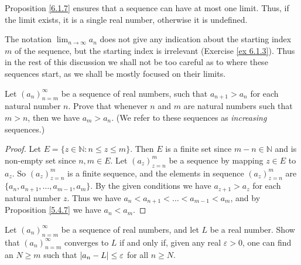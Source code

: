 \begin{note}
Proposition \ref{6.1.7} ensures that a sequence can have at most one limit.
Thus, if the limit exists, it is a single real number, otherwise it is undefined.
\end{note}

\begin{remark}\label{6.1.9}
The notation \(\lim_{n \to \infty} a_n\) does not give any indication about the starting index \(m\) of the sequence, but the starting index is irrelevant (Exercise \ref{ex 6.1.3}).
Thus in the rest of this discussion we shall not be too careful as to where these sequences start, as we shall be mostly focused on their limits.
\end{remark}

\exercisesection

\begin{exercise}\label{ex 6.1.1}
Let \((a_n)_{n = m}^\infty\) be a sequence of real numbers, such that \(a_{n + 1} > a_n\) for each natural number \(n\).
Prove that whenever \(n\) and \(m\) are natural numbers such that \(m > n\), then we have \(a_m > a_n\).
(We refer to these sequences as \emph{increasing} sequences.)
\end{exercise}

\begin{proof}
Let \(E = \{z \in \mathds{N} : n \leq z \leq m\}\).
Then \(E\) is a finite set since \(m - n \in \mathds{N}\) and is non-empty set since \(n, m \in E\).
Let \((a_z)_{z = n}^m\) be a sequence by mapping \(z \in E\) to \(a_z\).
So \((a_z)_{z = n}^m\) is a finite sequence, and the elements in sequence \((a_z)_{z = n}^m\) are \(\{a_n, a_{n + 1}, \dots, a_{m - 1}, a_m\}\).
By the given conditions we have \(a_{z + 1} > a_z\) for each natural number \(z\).
Thus we have \(a_n < a_{n + 1} < \dots < a_{m - 1} < a_m\), and by Proposition \ref{5.4.7} we have \(a_n < a_m\).
\end{proof}

\begin{exercise}\label{ex 6.1.2}
Let \((a_n)_{n = m}^\infty\) be a sequence of real numbers, and let \(L\) be a real number.
Show that \((a_n)_{n = m}^\infty\) converges to \(L\) if and only if, given any real \(\varepsilon > 0\), one can find an \(N \geq m\) such that \(\abs*{a_n - L} \leq \varepsilon\) for all \(n \geq N\).
\end{exercise}

